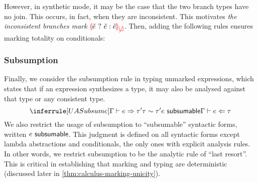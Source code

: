 However, in synthetic mode, it may be the case that the two branch types have no join. This occurs,
in fact, when they are inconsistent. This motivates \emph{the inconsistent branches mark}
$\ECInconBr{\ECMV}{\ECMV}{\ECMV}$. Then, adding the following rules ensures marking totality on
conditionals:
%
\begin{mathpar}

\end{mathpar}

\subsubsection{Subsumption}
\label{sec:calculus-subsumption}

Finally, we consider the subsumption rule in typing unmarked expressions, which states that if an
expression synthesizes a type, it may also be analysed against that type or any consistent type.
\[%
  \judgment{
    \ctxSynType{\ctx}{\EMV}{\TMV'} \\
    \consistent{\TMV}{\TMV'} \\
    \subsumable{\EMV}
  }{
    \ctxAnaType{\ctx}{\EMV}{\TMV}
  }{UASubsume}
\]%
We also restrict the usage of subsumption to ``subsumable'' syntactic forms, written
$\subsumable{\EMV}$. This judgment is defined on all syntactic forms except lambda abstractions and
conditionals, the only ones with explicit analysis rules. In other words, we restrict
subsumption to be the analytic rule of ``last resort''. This is critical in establishing that
marking and typing are deterministic (discussed later in \cref{thm:calculus-marking-unicity}).

